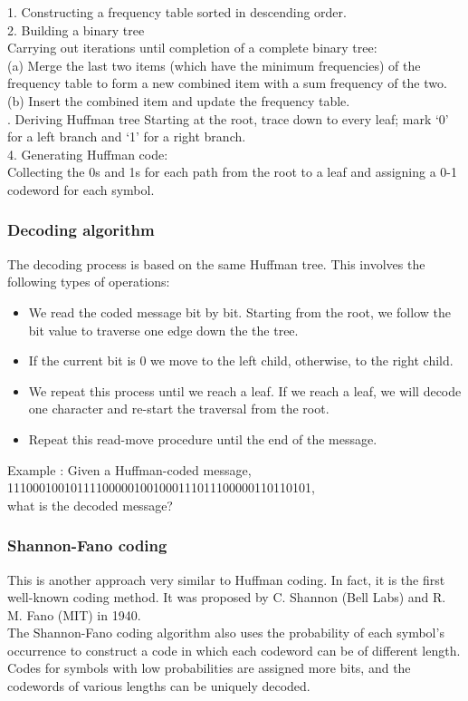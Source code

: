 \begin{frame}
\large
1. Constructing a frequency table sorted in descending order.\\
2. Building a binary tree\\
Carrying out iterations until completion of a complete binary tree:\\
(a) Merge the last two items (which have the minimum frequencies) of
the frequency table to form a new combined item with a sum
frequency of the two.\\
(b) Insert the combined item and update the frequency table.\\ . Deriving Huffman tree
Starting at the root, trace down to every leaf; mark ‘0’ for a left branch
and ‘1’ for a right branch.\\
4. Generating Huffman code:\\
Collecting the 0s and 1s for each path from the root to a leaf and
assigning a 0-1 codeword for each symbol.
\end{frame}
\begin{frame}
\frametitle{Decoding algorithm}
The decoding process is based on the same Huffman tree. This involves the
following types of operations:
\begin{itemize}
\item We read the coded message bit by bit. Starting from the root, we follow
the bit value to traverse one edge down the the tree.
\item If the current bit is 0 we move to the left child, otherwise, to the right
child.
\item We repeat this process until we reach a leaf. If we reach a leaf, we will
decode one character and re-start the traversal from the root.
\item Repeat this read-move procedure until the end of the message.
\end{itemize}
Example : Given a Huffman-coded message,\\
111000100101111000001001000111011100000110110101,\\
what is the decoded message?
\end{frame}
\begin{frame}
\frametitle{Shannon-Fano coding}
This is another approach very similar to Huffman coding. In fact, it is the
first well-known coding method. It was proposed by C. Shannon (Bell Labs)
and R. M. Fano (MIT) in 1940.\\
The Shannon-Fano coding algorithm also uses the probability of each
symbol’s occurrence to construct a code in which each codeword can be of
different length. \\Codes for symbols with low probabilities are assigned more
bits, and the codewords of various lengths can be uniquely decoded.
\end{frame}
